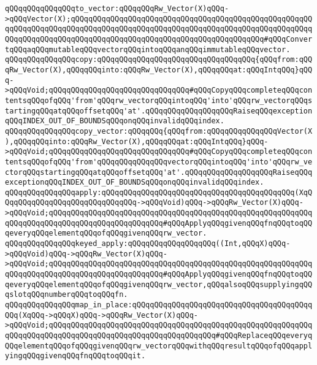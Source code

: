 \newline
\verb|qQQqqQQqqQQqqQQqto_vector:qQQqqQQqRw_Vector(X)qQQq->qQQqVector(X);qQQqqQQqqQQqqQQqqQQqqQQqqQQqqQQqqQQqqQQqqQQqqQQqqQQqqQQqqQQqqQQqqQQqqQQqqQQqqQQqqQQqqQQqqQQqqQQqqQQqqQQqqQQqqQQqqQQqqQQqqQQqqQQqqQQqqQQqqQQqqQQqqQQqqQQqqQQqqQQqqQQqqQQqqQQqqQQqqQQqqQQq#qQQqConvertqQQqaqQQqmutableqQQqvectorqQQqintoqQQqanqQQqimmutableqQQqvector.|\newline
\newline
\verb|qQQqqQQqqQQqqQQqcopy:qQQqqQQqqQQqqQQqqQQqqQQqqQQqqQQqqQQq{qQQqfrom:qQQqRw_Vector(X),qQQqqQQqinto:qQQqRw_Vector(X),qQQqqQQqat:qQQqIntqQQq}qQQq->qQQqVoid;qQQqqQQqqQQqqQQqqQQqqQQqqQQqqQQq#qQQqCopyqQQqcompleteqQQqcontentsqQQqofqQQq'from'qQQqrw_vectorqQQqintoqQQq'into'qQQqrw_vectorqQQqstartingqQQqatqQQqoffsetqQQq'at'.qQQqqQQqqQQqqQQqqQQqRaiseqQQqexceptionqQQqINDEX_OUT_OF_BOUNDSqQQqonqQQqinvalidqQQqindex.|\newline
\verb|qQQqqQQqqQQqqQQqcopy_vector:qQQqqQQq{qQQqfrom:qQQqqQQqqQQqqQQqVector(X),qQQqqQQqinto:qQQqRw_Vector(X),qQQqqQQqat:qQQqIntqQQq}qQQq->qQQqVoid;qQQqqQQqqQQqqQQqqQQqqQQqqQQqqQQq#qQQqCopyqQQqcompleteqQQqcontentsqQQqofqQQq'from'qQQqqQQqqQQqqQQqvectorqQQqintoqQQq'into'qQQqrw_vectorqQQqstartingqQQqatqQQqoffsetqQQq'at'.qQQqqQQqqQQqqQQqqQQqRaiseqQQqexceptionqQQqINDEX_OUT_OF_BOUNDSqQQqonqQQqinvalidqQQqindex.|\newline
\newline
\verb|qQQqqQQqqQQqqQQqapply:qQQqqQQqqQQqqQQqqQQqqQQqqQQqqQQqqQQqqQQqqQQq(XqQQqqQQqqQQqqQQqqQQqqQQqqQQqqQQq->qQQqVoid)qQQq->qQQqRw_Vector(X)qQQq->qQQqVoid;qQQqqQQqqQQqqQQqqQQqqQQqqQQqqQQqqQQqqQQqqQQqqQQqqQQqqQQqqQQqqQQqqQQqqQQqqQQqqQQqqQQqqQQqqQQqqQQq#qQQqApplyqQQqgivenqQQqfnqQQqtoqQQqeveryqQQqelementqQQqofqQQqgivenqQQqrw_vector.|\newline
\verb|qQQqqQQqqQQqqQQqkeyed_apply:qQQqqQQqqQQqqQQqqQQq((Int,qQQqX)qQQq->qQQqVoid)qQQq->qQQqRw_Vector(X)qQQq->qQQqVoid;qQQqqQQqqQQqqQQqqQQqqQQqqQQqqQQqqQQqqQQqqQQqqQQqqQQqqQQqqQQqqQQqqQQqqQQqqQQqqQQqqQQqqQQqqQQqqQQq#qQQqApplyqQQqgivenqQQqfnqQQqtoqQQqeveryqQQqelementqQQqofqQQqgivenqQQqrw_vector,qQQqalsoqQQqsupplyingqQQqslotqQQqnumberqQQqtoqQQqfn.|\newline
\newline
\verb|qQQqqQQqqQQqqQQqmap_in_place:qQQqqQQqqQQqqQQqqQQqqQQqqQQqqQQqqQQqqQQqqQQq(XqQQq->qQQqX)qQQq->qQQqRw_Vector(X)qQQq->qQQqVoid;qQQqqQQqqQQqqQQqqQQqqQQqqQQqqQQqqQQqqQQqqQQqqQQqqQQqqQQqqQQqqQQqqQQqqQQqqQQqqQQqqQQqqQQqqQQqqQQqqQQqqQQqqQQq#qQQqReplaceqQQqeveryqQQqelementqQQqofqQQqgivenqQQqrw_vectorqQQqwithqQQqresultqQQqofqQQqapplyingqQQqgivenqQQqfnqQQqtoqQQqit.|\newline
